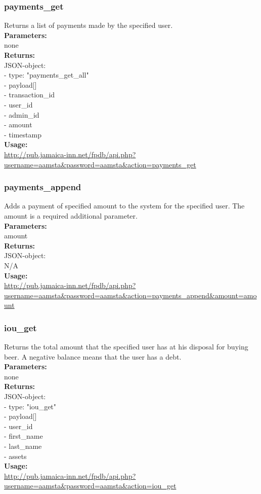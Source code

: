 \documentclass{article}
\begin{document}
\subsubsection{payments\_get}
Returns a list of payments made by the specified user.\\
\textbf{Parameters:}\\
none\\
\textbf{Returns:}\\
JSON-object:\\
- type: "payments\_get\_all"\\
- payload[]\\
\indent - transaction\_id\\
\indent - user\_id\\
\indent - admin\_id\\
\indent - amount\\
\indent - timestamp\\
\textbf{Usage:}\\
\url{http://pub.jamaica-inn.net/fpdb/api.php?username=aamsta\&password=aamsta\&action=payments\_get}\\

\subsubsection{payments\_append}
Adds a payment of specified amount to the system for the specified user. The amount is a required additional parameter.\\
\textbf{Parameters:}\\
amount\\
\textbf{Returns:}\\
JSON-object:\\
N/A\\
\textbf{Usage:}\\
\url{http://pub.jamaica-inn.net/fpdb/api.php?username=aamsta\&password=aamsta\&action=payments\_append\&amount=amount}\\

\subsubsection{iou\_get}
Returns the total amount that the specified user has at his disposal for buying beer. A negative balance means that the user has a debt.\\
\textbf{Parameters:}\\
none\\
\textbf{Returns:}\\
JSON-object:\\
- type: "iou\_get"\\
- payload[]\\
\indent - user\_id\\
\indent - first\_name\\
\indent - last\_name\\
\indent - assets\\
\textbf{Usage:}\\
\url{http://pub.jamaica-inn.net/fpdb/api.php?username=aamsta\&password=aamsta\&action=iou\_get}\\
 
\end{document}
